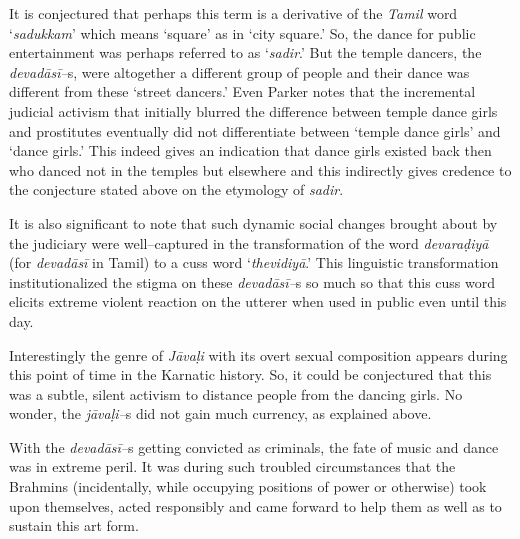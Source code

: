 It is conjectured that perhaps this term is a derivative of the \textit{Tamil} word ‘\textit{sadukkam}’ which means ‘square’ as in ‘city square.’ So, the dance for public entertainment was perhaps referred to as ‘\textit{sadir}.’ But the temple dancers, the \textit{devadāsī–}s, were altogether a different group of people and their dance was different from these ‘street dancers.’ Even Parker notes that the incremental judicial activism that initially blurred the difference between temple dance girls and prostitutes eventually did not differentiate between ‘temple dance girls’ and ‘dance girls.’ This indeed gives an indication that dance girls existed back then who danced not in the temples but elsewhere and this indirectly gives credence to the conjecture stated above on the etymology of \textit{sadir}.

It is also significant to note that such dynamic social changes brought about by the judiciary were well–captured in the transformation of the word \textit{devaraḍiyā} (for \textit{devadāsī} in Tamil) to a cuss word ‘\textit{thevidiyā}.’ This linguistic transformation institutionalized the stigma on these \textit{devadāsī–}s so much so that this cuss word elicits extreme violent reaction on the utterer when used in public even until this day.

Interestingly the genre of \textit{Jāvaḷi} with its overt sexual composition appears during this point of time in the Karnatic history. So, it could be conjectured that this was a subtle, silent activism to distance people from the dancing girls. No wonder, the \textit{jāvaḷi–}s did not gain much currency, as explained above.

With the \textit{devadāsī–}s getting convicted as criminals, the fate of music and dance was in extreme peril. It was during such troubled circumstances that the Brahmins (incidentally, while occupying positions of power or otherwise) took upon themselves, acted responsibly and came forward to help them as well as to sustain this art form.

